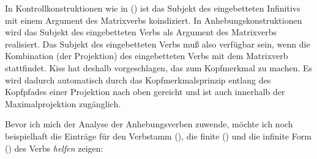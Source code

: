 In Kontrollkonstruktionen wie in () ist das Subjekt des eingebetteten
Infinitivs mit einem Argument des Matrixverbs koindiziert. In Anhebungskonstruktionen
wird das Subjekt des eingebetteten Verbs als Argument des Matrixverbs realisiert.
Das Subjekt des eingebetteten Verbs muß also verfügbar sein, wenn die Kombination
(der Projektion) des eingebetteten Verbs mit dem Matrixverb stattfindet. Kiss
hat deshalb vorgeschlagen, das \subjm zum Kopfmerkmal zu machen. Es wird dadurch
automatisch durch das Kopfmerkmalsprinzip entlang des Kopfpfades einer Projektion
nach oben gereicht und ist auch innerhalb der Maximalprojektion zugänglich.

Bevor ich mich der Analyse der Anhebungsverben zuwende, möchte ich noch beispielhaft die Einträge
für den Verbstamm (), die finite () und die infinite Form () des Verbs
\emph{helfen} zeigen:

